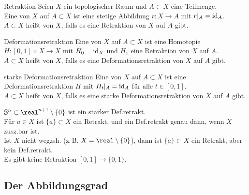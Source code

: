 \linie

\begin{Def}{Retraktion}
    Seien $X$ ein topologischer Raum und $A \subset X$ eine Teilmenge. \\
    Eine  von $X$ auf $A \subset X$ ist eine stetige
    Abbildung $r\colon X \rightarrow A$ mit $r|_A = \operatorname{id}_A$. \\
    $A \subset X$ heißt  von $X$, falls es eine Retraktion
    von $X$ auf $A$ gibt.
\end{Def}

\begin{Def}{Deformationsretraktion}
    Eine  von $X$ auf $A \subset X$
    ist eine Homotopie
    $H\colon [0, 1] \times X \rightarrow X$ mit $H_0 = \operatorname{id}_X$ und
    $H_1$ eine Retraktion von $X$ auf $A$. \\
    $A \subset X$ heißt  von $X$, falls es eine
    Deformationsretraktion von $X$ auf $A$ gibt.
\end{Def}

\begin{Def}{starke Deformationsretraktion}
    Eine  von $X$ auf $A \subset X$
    ist eine
    Deformationsretraktion $H$ mit $H_t|_A = \operatorname{id}_A$ für alle $t \in [0, 1]$. \\
    $A \subset X$ heißt  von $X$, falls es
    eine starke Deformationsretraktion von $X$ auf $A$ gibt.
\end{Def}

\begin{Bsp}
    $\sphere^n \subset \real^{n+1} \setminus \{0\}$ ist ein
    starker Def.retrakt. \\
    Für $a \in X$ ist $\{a\} \subset X$ ein Retrakt,
    und ein Def.retrakt genau dann, wenn $X$ zusz.bar ist. \\
    Ist $X$ nicht wegzsh. (z.\,B. $X = \real \setminus \{0\}$), dann ist
    $\{a\} \subset X$ ein Retrakt, aber kein Def.retrakt. \\
    Es gibt keine Retraktion $[0, 1] \rightarrow \{0, 1\}$.
\end{Bsp}

\pagebreak

\subsection{%
    Der Abbildungsgrad%
}

